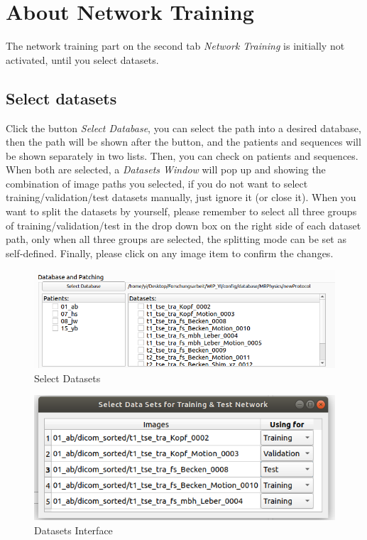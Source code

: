 \documentclass[12pt]{article}
\begin{document}
\graphicspath{ {images/} }
\section*{About Network Training}

The network training part on the second tab \textit{Network Training} is initially not activated, until you select datasets. 

\subsection{Select datasets}
Click the button \textit{Select Database}, you can select the path into a desired database, then the path will be shown after the button, and the patients and sequences will be shown separately in two lists. Then, you can check on patients and sequences. When both are selected, a \textit{Datasets Window} will pop up and showing the combination of image paths you selected, if you do not want to select training/validation/test datasets manually, just ignore it (or close it). When you want to split the datasets by yourself, please remember to select all three groups of training/validation/test in the drop down box on the right side of each dataset path, only when all three groups are selected, the splitting mode can be set as self-defined. Finally, please click on any image item to confirm the changes. 
\begin{figure}[htbp]	
	\centering
	\includegraphics[width=\textwidth]{select_datasets.png}
	\caption[Select Datasets]{Select Datasets}
	\label{fig:select_datasets}
\end{figure}
\begin{figure}[htbp]	
	\centering
	\includegraphics[width=\textwidth]{datasets_interface.png}
	\caption[Datasets Interface]{Datasets Interface}
	\label{fig:datasets_interface}
\end{figure}
\end{document}
